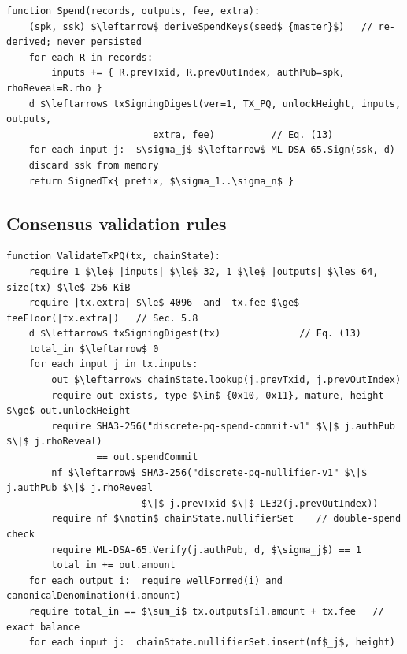 \documentclass[11pt,a4paper]{article}
\newcommand{\code}[1]{\texttt{\small #1}}
\begin{document}
\begin{algorithm}[tbp]
\caption{\textsc{Spend} --- wallet side, spending stored records $R_1..R_n$ to outputs $O_1..O_m$.}
\label{alg:spend}
\begin{lstlisting}[style=pseudo]
function Spend(records, outputs, fee, extra):
    (spk, ssk) $\leftarrow$ deriveSpendKeys(seed$_{master}$)   // re-derived; never persisted
    for each R in records:
        inputs += { R.prevTxid, R.prevOutIndex, authPub=spk, rhoReveal=R.rho }
    d $\leftarrow$ txSigningDigest(ver=1, TX_PQ, unlockHeight, inputs, outputs,
                          extra, fee)          // Eq. (13)
    for each input j:  $\sigma_j$ $\leftarrow$ ML-DSA-65.Sign(ssk, d)
    discard ssk from memory
    return SignedTx{ prefix, $\sigma_1..\sigma_n$ }
\end{lstlisting}
\end{algorithm}

\subsection{Consensus validation rules}\label{sec:validation}

\begin{algorithm}[tbp]
\caption{\textsc{ValidateTxPQ} --- node side, for each \code{TX\_PQ} transaction.}
\label{alg:validate}
\begin{lstlisting}[style=pseudo,basicstyle=\scriptsize\ttfamily]
function ValidateTxPQ(tx, chainState):
    require 1 $\le$ |inputs| $\le$ 32, 1 $\le$ |outputs| $\le$ 64, size(tx) $\le$ 256 KiB
    require |tx.extra| $\le$ 4096  and  tx.fee $\ge$ feeFloor(|tx.extra|)   // Sec. 5.8
    d $\leftarrow$ txSigningDigest(tx)              // Eq. (13)
    total_in $\leftarrow$ 0
    for each input j in tx.inputs:
        out $\leftarrow$ chainState.lookup(j.prevTxid, j.prevOutIndex)
        require out exists, type $\in$ {0x10, 0x11}, mature, height $\ge$ out.unlockHeight
        require SHA3-256("discrete-pq-spend-commit-v1" $\|$ j.authPub $\|$ j.rhoReveal)
                == out.spendCommit
        nf $\leftarrow$ SHA3-256("discrete-pq-nullifier-v1" $\|$ j.authPub $\|$ j.rhoReveal
                        $\|$ j.prevTxid $\|$ LE32(j.prevOutIndex))
        require nf $\notin$ chainState.nullifierSet    // double-spend check
        require ML-DSA-65.Verify(j.authPub, d, $\sigma_j$) == 1
        total_in += out.amount
    for each output i:  require wellFormed(i) and canonicalDenomination(i.amount)
    require total_in == $\sum_i$ tx.outputs[i].amount + tx.fee   // exact balance
    for each input j:  chainState.nullifierSet.insert(nf$_j$, height)
\end{lstlisting}
\end{algorithm}
\end{document}
